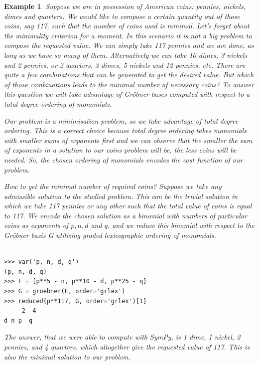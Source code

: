 \documentclass[12pt]{article}
\newtheorem{example}[theorem]{Example}
\begin{document}
\begin{example}
{\rm
Suppose we are in possession of American coins: pennies, nickels,
dimes and quarters. We would like to compose a certain quantity out of
those coins, say 117, such that the number of coins used is
minimal. Let's forget about the minimality criterion for a moment. In
this scenario it is not a big problem to compose the requested
value. We can simply take 117 pennies and we are done, as long as we
have so many of them. Alternatively we can take 10 dimes, 3 nickels
and 2 pennies, or 2 quarters, 3 dimes, 5 nickels and 12 pennies,
etc. There are quite a few combinations that can be generated to get
the desired value. But which of those combinations leads to the
minimal number of necessary coins? To answer this question we will
take advantage of Gr\"obner bases computed with respect to a total
degree ordering of monomials.

Our problem is a minimisation problem, so we take advantage of total
degree ordering. 
This is a correct choice because total degree ordering takes monomials
with smaller sums 
of exponents first and we can observe that the smaller the sum of
exponents in a solution 
to our coins problem will be, the less coins will be needed. So, the
chosen ordering of 
monomials encodes the cost function of our problem.

How to get the minimal number of required coins? Suppose we take any
admissible solution 
to the studied problem. This can be the trivial solution in which we
take 117 pennies or any 
other such that the total value of coins is equal to 117. We encode
the chosen solution as a 
binomial with numbers of particular coins as exponents of $p, n, d$ and
$q$, and we reduce this 
binomial with respect to the Gr\"obner basis G utilizing
graded lexicographic ordering of monomials.


\begin{Verbatim}[fontsize=\scriptsize,fontfamily=courier,fontshape=tt,frame=single,label=SymPy]

>>> var('p, n, d, q')
(p, n, d, q)
>>> F = [p**5 - n, p**10 - d, p**25 - q]
>>> G = groebner(F, order='grlex')
>>> reduced(p**117, G, order='grlex')[1]
     2  4
d n p  q

\end{Verbatim}

\noindent
The answer, that we were able to compute with SymPy, is 1
dime, 1 nickel, 2 pennies, and 4 quarters.
which altogether give the requested value of 117. This is also the minimal solution to our problem. 
}
\end{example}
\end{document}
